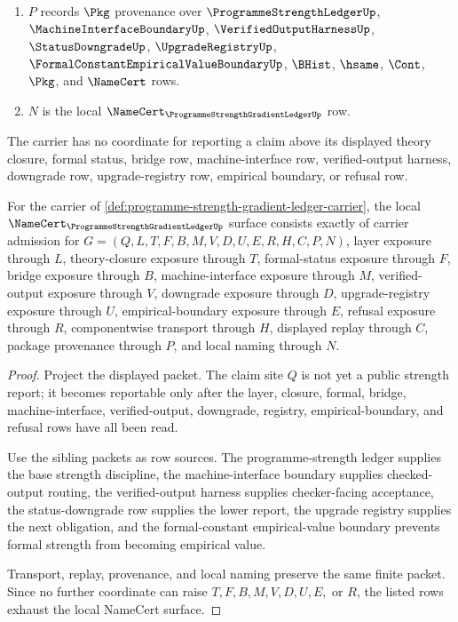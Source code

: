 \begin{definition}
\begin{enumerate}
\item $P$ records $\Pkg$ provenance over $\ProgrammeStrengthLedgerUp$, $\MachineInterfaceBoundaryUp$, $\VerifiedOutputHarnessUp$, $\StatusDowngradeUp$, $\UpgradeRegistryUp$, $\FormalConstantEmpiricalValueBoundaryUp$, $\BHist$, $\hsame$, $\Cont$, $\Pkg$, and $\NameCert$ rows.
\item $N$ is the local $\NameCert_{\ProgrammeStrengthGradientLedgerUp}$ row.
\end{enumerate}
The carrier has no coordinate for reporting a claim above its displayed theory closure, formal status, bridge row, machine-interface row, verified-output harness, downgrade row, upgrade-registry row, empirical boundary, or refusal row.
\end{definition}

\begin{theorem}
\label{thm:programme-strength-ledger-obligations}
For the carrier of \autoref{def:programme-strength-gradient-ledger-carrier}, the local $\NameCert_{\ProgrammeStrengthGradientLedgerUp}$ surface consists exactly of carrier admission for $G=(Q,L,T,F,B,M,V,D,U,E,R,H,C,P,N)$, layer exposure through $L$, theory-closure exposure through $T$, formal-status exposure through $F$, bridge exposure through $B$, machine-interface exposure through $M$, verified-output exposure through $V$, downgrade exposure through $D$, upgrade-registry exposure through $U$, empirical-boundary exposure through $E$, refusal exposure through $R$, componentwise transport through $H$, displayed replay through $C$, package provenance through $P$, and local naming through $N$.
\end{theorem}
\begin{proof}
Project the displayed packet. The claim site $Q$ is not yet a public strength report; it becomes reportable only after the layer, closure, formal, bridge, machine-interface, verified-output, downgrade, registry, empirical-boundary, and refusal rows have all been read.

Use the sibling packets as row sources. The programme-strength ledger supplies the base strength discipline, the machine-interface boundary supplies checked-output routing, the verified-output harness supplies checker-facing acceptance, the status-downgrade row supplies the lower report, the upgrade registry supplies the next obligation, and the formal-constant empirical-value boundary prevents formal strength from becoming empirical value.

Transport, replay, provenance, and local naming preserve the same finite packet. Since no further coordinate can raise $T,F,B,M,V,D,U,E,$ or $R$, the listed rows exhaust the local NameCert surface.
\end{proof}


